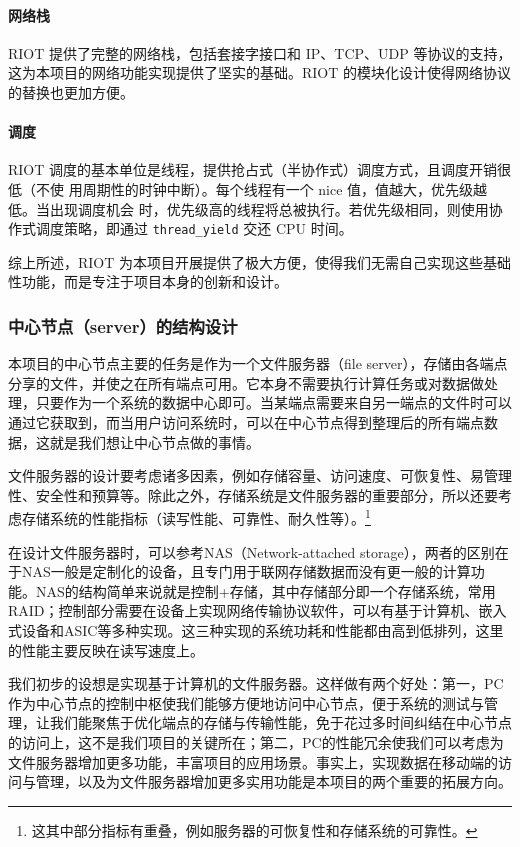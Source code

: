\documentclass{ctexart}
\begin{document}
\paragraph{网络栈}
RIOT 提供了完整的网络栈，包括套接字接口和 IP、TCP、UDP 等协议的支持，这为本项目的网络功能实现提供了坚实的基础。RIOT 的模块化设计使得网络协议的替换也更加方便。

\paragraph{调度}
RIOT 调度的基本单位是线程，提供抢占式（半协作式）调度方式，且调度开销很低（不使
用周期性的时钟中断）。每个线程有一个 nice 值，值越大，优先级越低。当出现调度机会
时，优先级高的线程将总被执行。若优先级相同，则使用协作式调度策略，即通过
\verb|thread_yield| 交还 CPU 时间。

综上所述，RIOT 为本项目开展提供了极大方便，使得我们无需自己实现这些基础性功能，而是专注于项目本身的创新和设计。

\subsubsection{中心节点（server）的结构设计}

本项目的中心节点主要的任务是作为一个文件服务器（file server），存储由各端点分享的文件，并使之在所有端点可用。它本身不需要执行计算任务或对数据做处理，只要作为一个系统的数据中心即可。当某端点需要来自另一端点的文件时可以通过它获取到，而当用户访问系统时，可以在中心节点得到整理后的所有端点数据，这就是我们想让中心节点做的事情。

文件服务器的设计要考虑诸多因素，例如存储容量、访问速度、可恢复性、易管理性、安全性和预算等。除此之外，存储系统是文件服务器的重要部分，所以还要考虑存储系统的性能指标（读写性能、可靠性、耐久性等）。\footnote{这其中部分指标有重叠，例如服务器的可恢复性和存储系统的可靠性。}

在设计文件服务器时，可以参考NAS（Network-attached storage），两者的区别在于NAS一般是定制化的设备，且专门用于联网存储数据而没有更一般的计算功能。NAS的结构简单来说就是控制+存储，其中存储部分即一个存储系统，常用RAID；控制部分需要在设备上实现网络传输协议软件，可以有基于计算机、嵌入式设备和ASIC等多种实现。这三种实现的系统功耗和性能都由高到低排列，这里的性能主要反映在读写速度上。

我们初步的设想是实现基于计算机的文件服务器。这样做有两个好处：第一，PC作为中心节点的控制中枢使我们能够方便地访问中心节点，便于系统的测试与管理，让我们能聚焦于优化端点的存储与传输性能，免于花过多时间纠结在中心节点的访问上，这不是我们项目的关键所在；第二，PC的性能冗余使我们可以考虑为文件服务器增加更多功能，丰富项目的应用场景。事实上，实现数据在移动端的访问与管理，以及为文件服务器增加更多实用功能是本项目的两个重要的拓展方向。
\end{document}
